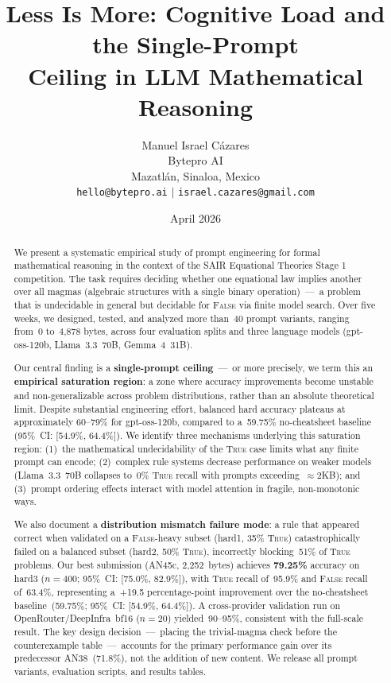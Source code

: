 \documentclass[11pt]{article}
\title{\textbf{Less Is More: Cognitive Load and the Single-Prompt\\
Ceiling in LLM Mathematical Reasoning}}
\author{
  Manuel Israel C\'{a}zares \\
  Bytepro AI \\
  Mazatl\'{a}n, Sinaloa, Mexico \\
  \texttt{hello@bytepro.ai} $|$ \texttt{israel.cazares@gmail.com}
}
\date{April 2026}
\begin{document}
\maketitle

\begin{abstract}
We present a systematic empirical study of prompt engineering for
formal mathematical reasoning in the context of the SAIR Equational
Theories Stage 1 competition. The task requires deciding whether one
equational law implies another over all magmas (algebraic structures
with a single binary operation)~---~a problem that is undecidable in
general but decidable for \textsc{False} via finite model search. Over
five weeks, we designed, tested, and analyzed more than~40 prompt
variants, ranging from~0 to~4{,}878 bytes, across four evaluation
splits and three language models (gpt-oss-120b, Llama~3.3~70B,
Gemma~4~31B).

Our central finding is a \textbf{single-prompt ceiling}~---~or more
precisely, we term this an \textbf{empirical saturation region}: a zone
where accuracy improvements become unstable and non-generalizable across
problem distributions, rather than an absolute theoretical limit. Despite
substantial engineering effort, balanced hard accuracy plateaus at
approximately 60--79\% for gpt-oss-120b, compared to a~59.75\%
no-cheatsheet baseline (95\%~CI: [54.9\%, 64.4\%]). We identify three
mechanisms underlying this saturation region: (1)~the mathematical
undecidability of the \textsc{True} case limits what any finite prompt
can encode; (2)~complex rule systems decrease performance on weaker models
(Llama~3.3~70B collapses to~0\% \textsc{True} recall with prompts
exceeding~$\approx$2KB); and (3)~prompt ordering effects interact with
model attention in fragile, non-monotonic ways.

We also document a \textbf{distribution mismatch failure mode}: a
rule that appeared correct when validated on a \textsc{False}-heavy
subset (hard1, 35\% \textsc{True}) catastrophically failed on a balanced
subset (hard2, 50\% \textsc{True}), incorrectly blocking~51\% of
\textsc{True} problems. Our best submission (AN45c, 2{,}252~bytes) achieves \textbf{79.25\%}
accuracy on hard3 ($n=400$; 95\%~CI: [75.0\%, 82.9\%]), with
\textsc{True} recall of~95.9\% and \textsc{False} recall of~63.4\%,
representing a~+19.5 percentage-point improvement over the
no-cheatsheet baseline~(59.75\%; 95\%~CI: [54.9\%, 64.4\%]). A cross-provider validation run on
OpenRouter/DeepInfra~bf16 ($n=20$) yielded~90--95\%, consistent with
the full-scale result. The key design decision~---~placing the
trivial-magma check before the counterexample table~---~accounts for
the primary performance gain over its predecessor AN38~(71.8\%),
not the addition of new content. We release all prompt variants,
evaluation scripts, and results tables.
\end{abstract}
\end{document}
